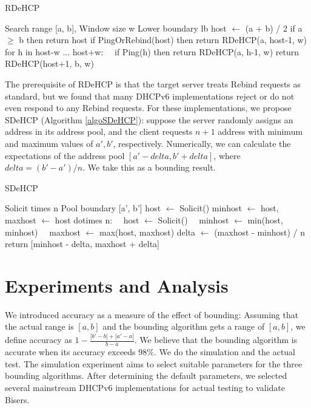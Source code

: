 \documentclass[conference]{IEEEtran}
\begin{document}
\begin{algorithm}[H]
  \caption{RDeHCP}
  \label{algoRDeHCP}
  \renewcommand{\algorithmicrequire}{\textbf{Input:}}
  \renewcommand{\algorithmicensure}{\textbf{Output:}}
  \begin{algorithmic}[1]
    \REQUIRE Search range [a, b], Window size w
    \ENSURE Lower boundary lb
    \STATE host $\gets$ (a + b) / 2
    \STATE if a $\ge$ b then return host
    \STATE if PingOrRebind(host) then return RDeHCP(a, host-1, w)
    \STATE for h in host-w ... host+w:
    \STATE \ \ if Ping(h) then return RDeHCP(a, h-1, w)
    \STATE return RDeHCP(host+1, b, w)
  \end{algorithmic}
\end{algorithm}

The prerequisite of RDeHCP is that the target server treats Rebind
requests as standard, but we found that many DHCPv6 implementations
reject or do not even respond to any Rebind requests. For these
implementations, we propose SDeHCP (Algorithm \ref{algoSDeHCP}):
suppose the server randomly assigns an address in its address pool,
and the client requests $n+1$ address with minimum and maximum values
of $a', b'$, respectively. Numerically, we can calculate the
expectations of the address pool $[a'-delta, b'+delta]$, where
$delta = (b'-a')/n$. We take this as a bounding result.

\begin{algorithm}[H]
  \caption{SDeHCP}
  \label{algoSDeHCP}
  \renewcommand{\algorithmicrequire}{\textbf{Input:}}
  \renewcommand{\algorithmicensure}{\textbf{Output:}}
  \begin{algorithmic}[1]
    \REQUIRE Solicit times n
    \ENSURE Pool boundary [a', b']
    \STATE host $\gets$ Solicit()
    \STATE minhost $\gets$ host, maxhost $\gets$ host
    \STATE dotimes n:
    \STATE \ \ host $\gets$ Solicit()
    \STATE \ \ minhost $\gets$ min(host, minhost)
    \STATE \ \ maxhost $\gets$ max(host, maxhost)
    \STATE delta $\gets$ (maxhost - minhost) / n
    \STATE return [minhost - delta, maxhost + delta]
  \end{algorithmic}
\end{algorithm}

\section{Experiments and Analysis}

We introduced accuracy as a measure of the effect of bounding:
Assuming that the actual range is $[a, b]$ and the bounding algorithm
gets a range of $[a, b]$, we define accuracy as
$1-\frac{|b'-b|+|a'-a|}{b-a}$. We believe that the bounding algorithm
is accurate when its accuracy exceeds $98\%$. We do the simulation and
the actual test. The simulation experiment aims to select suitable
parameters for the three bounding algorithms. After determining the
default parameters, we selected several mainstream DHCPv6
implementations for actual testing to validate Bisers.
\end{document}
